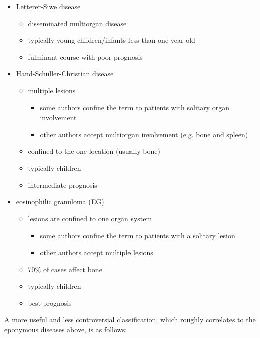 \begin{itemize}
	\item
	Letterer-Siwe disease
	
	\begin{itemize}
		\item
		disseminated multiorgan disease
		\item
		typically young children/infants less than one year old
		\item
		fulminant course with poor prognosis
	\end{itemize}
	\item
	Hand-Schüller-Christian disease
	
	\begin{itemize}
		\item
		multiple lesions
		
		\begin{itemize}
			\item
			some authors confine the term to patients with solitary organ involvement 
			\item
			other authors accept multiorgan involvement (e.g. bone and spleen)
		\end{itemize}
		\item
		confined to the one location (usually bone)
		\item
		typically children
		\item
		intermediate prognosis
	\end{itemize}
	\item
	eosinophilic granuloma (EG)
	
	\begin{itemize}
		\item
		lesions are confined to one organ system
		
		\begin{itemize}
			\item
			some authors confine the term to patients with a solitary lesion 
			\item
			other authors accept multiple lesions 
		\end{itemize}
		\item
		70\% of cases affect bone
		\item
		typically children
		\item
		best prognosis
	\end{itemize}
\end{itemize}

A more useful and less controversial classification, which roughly correlates to the eponymous diseases above, is as follows:

